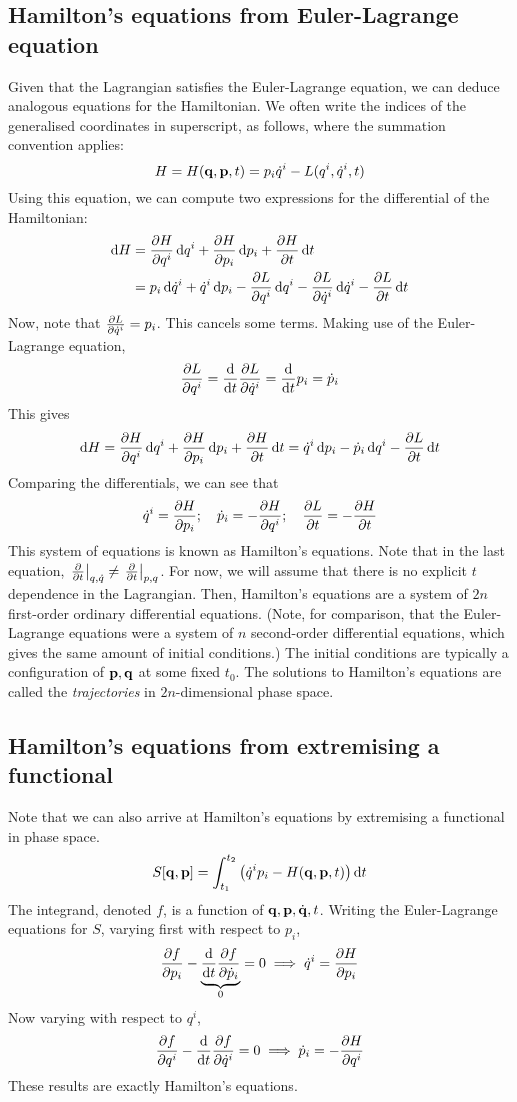 \subsection{Hamilton's equations from Euler-Lagrange equation}
Given that the Lagrangian satisfies the Euler-Lagrange equation, we can deduce analogous equations for the Hamiltonian.
We often write the indices of the generalised coordinates in superscript, as follows, where the summation convention applies:
\[
	H = H(\vb q, \vb p, t) = p_i \dot q^i - L(q^i, \dot q^i, t)
\]
Using this equation, we can compute two expressions for the differential of the Hamiltonian:
\begin{align*}
	\dd{H} & = \pdv{H}{q^i} \dd{q^i} + \pdv{H}{p_i} \dd{p_i} + \pdv{H}{t} \dd{t}                                                  \\
	       & = p_i \dd{\dot{q}^i} + \dot{q}^i \dd{p_i} - \pdv{L}{q^i}\dd{q^i} - \pdv{L}{\dot q^i}\dd{\dot q^i} - \pdv{L}{t}\dd{t}
\end{align*}
Now, note that \( \pdv{L}{\dot q^i} = p_i \).
This cancels some terms.
Making use of the Euler-Lagrange equation,
\[
	\pdv{L}{q^i} = \dv{t} \pdv{L}{\dot q^i} = \dv{t} p_i = \dot{p}_i
\]
This gives
\[
	\dd{H} = \pdv{H}{q^i} \dd{q^i} + \pdv{H}{p_i} \dd{p_i} + \pdv{H}{t} \dd{t} = \dot{q}^i \dd{p_i} - \dot{p}_i\dd{q^i} - \pdv{L}{t}\dd{t}
\]
Comparing the differentials, we can see that
\[
	\dot{q}^i = \pdv{H}{p_i};\quad \dot{p}_i = -\pdv{H}{q^i};\quad \pdv{L}{t} = -\pdv{H}{t}
\]
This system of equations is known as Hamilton's equations.
Note that in the last equation, \( \eval{\pdv{t}}_{q,\dot q} \neq \eval{\pdv{t}}_{p,q} \).
For now, we will assume that there is no explicit \( t \) dependence in the Lagrangian.
Then, Hamilton's equations are a system of \( 2n \) first-order ordinary differential equations.
(Note, for comparison, that the Euler-Lagrange equations were a system of \( n \) second-order differential equations, which gives the same amount of initial conditions.)
The initial conditions are typically a configuration of \( \vb p, \vb q \) at some fixed \( t_0 \).
The solutions to Hamilton's equations are called the \textit{trajectories} in \( 2n \)-dimensional phase space.

\subsection{Hamilton's equations from extremising a functional}
Note that we can also arrive at Hamilton's equations by extremising a functional in phase space.
\[
	S[\vb q, \vb p] = \int_{t_1}^{t_2} \qty( \dot q^i p_i - H(\vb q, \vb p, t)) \dd{t}
\]
The integrand, denoted \( f \), is a function of \( \vb q, \vb p, \dot{\vb q}, t \).
Writing the Euler-Lagrange equations for \( S \), varying first with respect to \( p_i \),
\[
	\pdv{f}{p_i} - \underbrace{\dv{t}\pdv{f}{\dot p_i}}_0 = 0 \implies \dot q^i = \pdv{H}{p_i}
\]
Now varying with respect to \( q^i \),
\[
	\pdv{f}{q^i} - \dv{t}\pdv{f}{\dot q^i} = 0 \implies \dot p_i = -\pdv{H}{q^i}
\]
These results are exactly Hamilton's equations.
